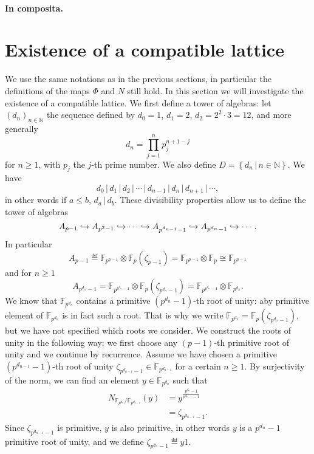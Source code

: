 \documentclass[a4paper,11pt]{article}
\begin{document}
\paragraph{In composita.}



\section{Existence of a compatible lattice}
\label{sec:existence}
We use the same notations as in the previous sections, in particular the
definitions of the maps $\Phi$ and $N$ still hold.
In this section we will investigate the existence of a compatible lattice. We
first define a tower of algebras: let $(d_n)_{n\in\mathbb{N}}$ the sequence
defined by $d_0=1$, $d_1=2$, $d_2=2^2\cdot 3=12$, and more generally
\[
  d_n = \prod_{j=1}^n p_j^{n+1-j}
\]
for $n\geq1$, with $p_j$ the $j$-th prime number. We also define
$D=\left\{d_n\,|\,n\in\mathbb{N}\right\}$. We have 
\[
  d_0\,|\,d_1\,|\,d_2\,|\,\cdots\,|\,d_{n-1}\,|\,d_n\,|\,d_{n+1}\,|\,\cdots,
\]
in other words if $a\leq b$, $d_a\,|\,d_b$. These divisibility properties allow
us to define the tower of algebras
\[
  A_{p-1}\hookrightarrow A_{p^{2}-1}\hookrightarrow\cdots\hookrightarrow A_{p^{d_{n-1}}-1}\hookrightarrow
  A_{p^{d_n}-1}\hookrightarrow\cdots.
\]
In particular
\[
  A_{p-1}\eqdef
\mathbb{F}_{p^{p-1}}\otimes\mathbb{F}_{p}(\zeta_{p-1})=\mathbb{F}_{p^{p-1}}\otimes\mathbb{F}_p\cong\mathbb{F}_{p^{p-1}}
\]
and for $n\geq1$
\[
  A_{p^{d_n}-1}=\mathbb{F}_{p^{p^{d_n}-1}}\otimes\mathbb{F}_p(\zeta_{p^{d_n}-1})=\mathbb{F}_{p^{p^{d_n}-1}}\otimes\mathbb{F}_{p^{d_n}}.
\]
We know that $\mathbb{F}_{p^{d_n}}$ contains a primitive $(p^{d_n}-1)$-th root
of unity: aby primitive element of $\mathbb{F}_{p^{d_n}}$ is in fact such a
root. That is why we write
$\mathbb{F}_{p^{d_n}}=\mathbb{F}_{p}(\zeta_{p^{d_n}-1})$, but we have not
specified which roots we consider.
We construct the roots of unity in the following way: we first choose any $(p-1)$-th primitive root of unity and we continue by recurrence. Assume we have
chosen a primitive $(p^{d_{n-1}}-1)$-th root of unity
$\zeta_{p^{d_{n-1}}-1}\in\mathbb{F}_{p^{d_{n-1}}}$
for a certain $n\geq1$. By surjectivity of the norm, we can find an element
$y\in\mathbb{F}_{p^{d_n}}$ such that
\begin{align*}
  N_{\mathbb{F}_{p^{d_n}}/\mathbb{F}_{p^{d_{n-1}}}}(y)&=y^{\frac{p^{d_n}-1}{p^{d_{n-1}}-1}}\\
  &=\zeta_{p^{d_{n-1}}-1}.
\end{align*}
Since $\zeta_{p^{d_{n-1}}-1}$ is primitive, $y$ is also primitive, in other
words $y$ is a $p^{d_n}-1$ primitive root of unity, and we define
$\zeta_{p^{d_n}-1}\eqdef y$1.
\end{document}
